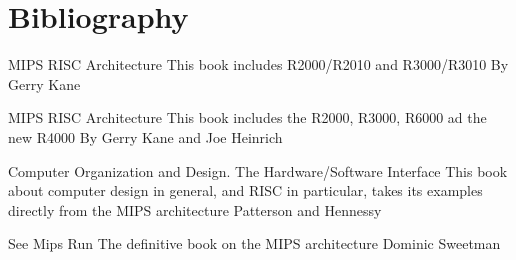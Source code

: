 %
%

\section{Bibliography}

\begin{thebibliography}{4}

    MIPS RISC Architecture
    \newblock This book includes R2000/R2010 and R3000/R3010
    \newblock By Gerry Kane

    MIPS RISC Architecture
    \newblock This book includes the R2000, R3000, R6000 ad the new R4000
    \newblock By Gerry Kane and Joe Heinrich

    Computer Organization and Design. The Hardware/Software Interface
    \newblock This book about computer design in general, and RISC
    in particular, takes its examples directly from the MIPS architecture
    \newblock Patterson and Hennessy

    See Mips Run
    \newblock The definitive book on the MIPS architecture
    \newblock Dominic Sweetman

\end{thebibliography}


